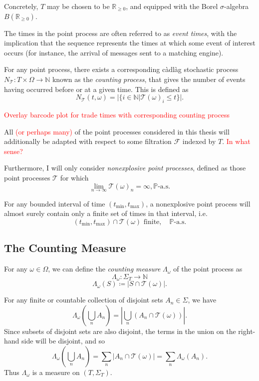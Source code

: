 \documentclass[honours,12pt]{unswthesis}
\numberwithin{equation}{section}
\begin{document}
Concretely, $T$ may be chosen to be $\mathbb{R}_{\geq 0}$, and equipped with the Borel $\sigma$-algebra $B\left(\mathbb{R}_{\geq 0}\right)$.

The times in the point process are often referred to as \textit{event times}, with the implication that the sequence represents the times at which some event of interest occurs (for instance, the arrival of messages sent to a matching engine).

{\noindent}For any point process, there exists a corresponding càdlàg stochastic process $N_{\mathcal T}:T\times\Omega\to\mathbb{N}$ known as the \textit{counting process}, that gives the number of events having occurred before or at a given time. This is defined as
$$N_{\mathcal T}(t,\omega) = \vert \{i\in\mathbb N \vert \mathcal{T}(\omega)_i \leq t\} \vert.$$

\textcolor{red}{Overlay barcode plot for trade times with corresponding counting process}

All \textcolor{red}{(or perhaps many)} of the point processes considered in this thesis will additionally be adapted with respect to some filtration $\mathcal F$ indexed by $T$. \textcolor{red}{In what sense?}

Furthermore, I will only consider \textit{nonexplosive point processes}, defined as those point processes $\mathcal{T}$ for which
$$\lim_{n\to\infty}\mathcal{T}(\omega)_n=\infty, \mathbb{P}\text{-a.s.}$$

For any bounded interval of time $(t_{\min},t_{\max})$, a nonexplosive point process will almost surely contain only a finite set of times in that interval, i.e.
$$(t_{\min},t_{\max}) \cap \mathcal{T}(\omega) \text{ finite},\quad\mathbb{P}\text{-a.s.}$$

\subsection{The Counting Measure}
For any $\omega\in\Omega$, we can define the \textit{counting measure} $\Lambda_\omega$ of the point process as
$$\Lambda_\omega : \Sigma_T \to \mathbb{N}$$
$$\Lambda_\omega(S) \coloneq \left\vert S\cap \mathcal{T}(\omega)\right\vert.$$

For any finite or countable collection of disjoint sets $A_n\in\Sigma$, we have
$$\Lambda_\omega\left(\bigcup_n A_n\right) = \left\vert \bigcup_n \left(A_n\cap\mathcal{T}(\omega)\right)\right\vert.$$
Since subsets of disjoint sets are also disjoint, the terms in the union on the right-hand side will be disjoint, and so
$$\Lambda_\omega\left(\bigcup_n A_n\right) = \sum_n\left\vert A_n\cap \mathcal{T}(\omega)\right\vert = \sum_n \Lambda_\omega(A_n).$$
Thus $\Lambda_\omega$ is a measure on $(T,\Sigma_T)$.
\end{document}
